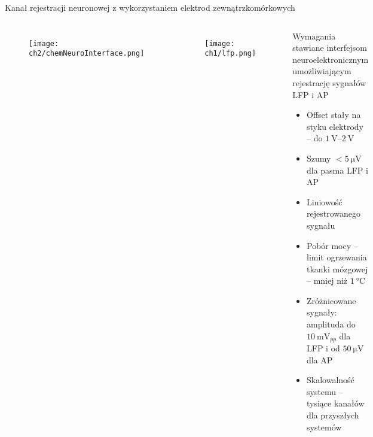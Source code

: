 \begin{frame}{Kanał rejestracji neuronowej z wykorzystaniem elektrod zewnątrzkomórkowych}
\vspace{-1em}
    \begin{columns}
        \begin{figure}[H]
            \centering
            \texttt{[image: ch2/chemNeuroInterface.png]} 

        \end{figure}
        \begin{figure}[H]
            \centering
            \texttt{[image: ch1/lfp.png]} 

          \end{figure}

        \begin{block}{Wymagania stawiane interfejsom neuroelektronicznym umożliwiającym rejestrację sygnałów LFP i AP}
            \begin{itemize}
                \item Offset stały na styku elektrody -- do $\SIrange{1}{2}{\volt}$ 
                \item Szumy $<\SI{5}{\micro\volt}$ dla pasma LFP i AP
                \item Liniowość rejestrowanego sygnału
                \item Pobór mocy -- limit ogrzewania tkanki mózgowej --  mniej niż  $\SI{1}{\degreeCelsius}$ 
                \item Zróżnicowane sygnały: amplituda do $\SI{10}{\milli\volt_{pp}}$ dla LFP i od  $\SI{50}{\micro\volt}$ dla AP
                \item Skalowalność systemu -- tysiące kanałów dla przyszłych systemów
            \end{itemize}
        \end{block}
 
    \end{columns}
\end{frame}



